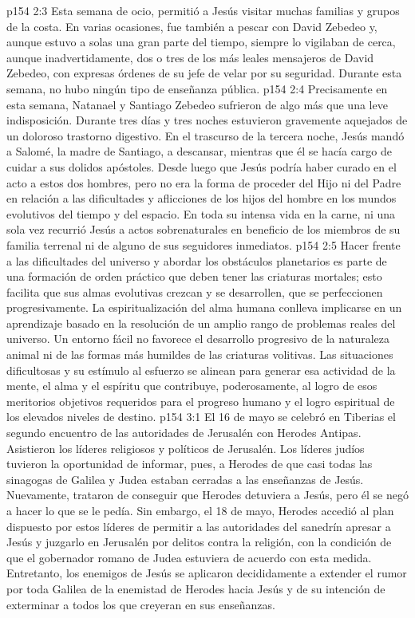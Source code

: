 \vs p154 2:3 Esta semana de ocio, permitió a Jesús visitar muchas familias y grupos de la costa. En varias ocasiones, fue también a pescar con David Zebedeo y, aunque estuvo a solas una gran parte del tiempo, siempre lo vigilaban de cerca, aunque inadvertidamente, dos o tres de los más leales mensajeros de David Zebedeo, con expresas órdenes de su jefe de velar por su seguridad. Durante esta semana, no hubo ningún tipo de enseñanza pública.
\vs p154 2:4 \pc Precisamente en esta semana, Natanael y Santiago Zebedeo sufrieron de algo más que una leve indisposición. Durante tres días y tres noches estuvieron gravemente aquejados de un doloroso trastorno digestivo. En el trascurso de la tercera noche, Jesús mandó a Salomé, la madre de Santiago, a descansar, mientras que él se hacía cargo de cuidar a sus dolidos apóstoles. Desde luego que Jesús podría haber curado en el acto a estos dos hombres, pero no era la forma de proceder del Hijo ni del Padre en relación a las dificultades y aflicciones de los hijos del hombre en los mundos evolutivos del tiempo y del espacio. En toda su intensa vida en la carne, ni una sola vez recurrió Jesús a actos sobrenaturales en beneficio de los miembros de su familia terrenal ni de alguno de sus seguidores inmediatos.
\vs p154 2:5 Hacer frente a las dificultades del universo y abordar los obstáculos planetarios es parte de una formación de orden práctico que deben tener las criaturas mortales; esto facilita que sus almas evolutivas crezcan y se desarrollen, que se perfeccionen progresivamente. La espiritualización del alma humana conlleva implicarse en un aprendizaje basado en la resolución de un amplio rango de problemas reales del universo. Un entorno fácil no favorece el desarrollo progresivo de la naturaleza animal ni de las formas más humildes de las criaturas volitivas. Las situaciones dificultosas y su estímulo al esfuerzo se alinean para generar esa actividad de la mente, el alma y el espíritu que contribuye, poderosamente, al logro de esos meritorios objetivos requeridos para el progreso humano y el logro espiritual de los elevados niveles de destino.
\vs p154 3:1 El 16 de mayo se celebró en Tiberias el segundo encuentro de las autoridades de Jerusalén con Herodes Antipas. Asistieron los líderes religiosos y políticos de Jerusalén. Los líderes judíos tuvieron la oportunidad de informar, pues, a Herodes de que casi todas las sinagogas de Galilea y Judea estaban cerradas a las enseñanzas de Jesús. Nuevamente, trataron de conseguir que Herodes detuviera a Jesús, pero él se negó a hacer lo que se le pedía. Sin embargo, el 18 de mayo, Herodes accedió al plan dispuesto por estos líderes de permitir a las autoridades del sanedrín apresar a Jesús y juzgarlo en Jerusalén por delitos contra la religión, con la condición de que el gobernador romano de Judea estuviera de acuerdo con esta medida. Entretanto, los enemigos de Jesús se aplicaron decididamente a extender el rumor por toda Galilea de la enemistad de Herodes hacia Jesús y de su intención de exterminar a todos los que creyeran en sus enseñanzas.
